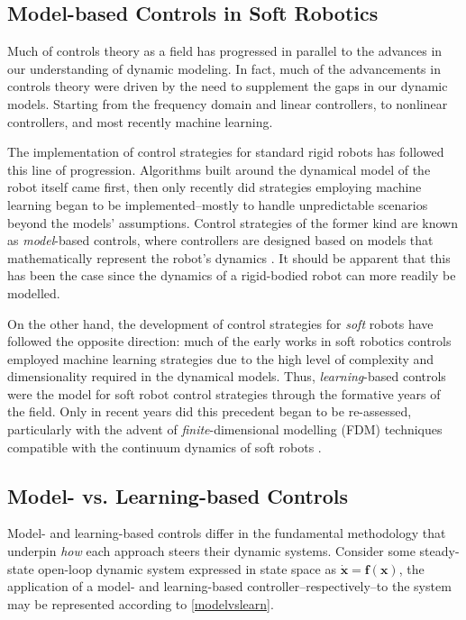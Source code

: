 \subsection{Model-based Controls in Soft Robotics}
Much of controls theory as a field has progressed in parallel to the advances in our understanding of dynamic modeling. In fact, much of the advancements in controls theory were driven by the need to supplement the gaps in our dynamic models. Starting from the frequency domain and linear controllers, to nonlinear controllers, and most recently machine learning. 

The implementation of control strategies for standard rigid robots has followed this line of progression. Algorithms built around the dynamical model of the robot itself came first, then only recently did strategies employing machine learning began to be implemented--mostly to handle unpredictable scenarios beyond the models' assumptions. Control strategies of the former kind are known as \textit{model}-based controls, where controllers are designed based on models that mathematically represent the robot's dynamics \cite{rakhmatillaev_integrative_2025}. It should be apparent that this has been the case since the dynamics of a rigid-bodied robot can more readily be modelled. 

On the other hand, the development of control strategies for \textit{soft} robots have followed the opposite direction: much of the early works in soft robotics controls employed machine learning strategies due to the high level of complexity and dimensionality required in the dynamical models. Thus, \textit{learning}-based controls were the model for soft robot control strategies through the formative years of the field. Only in recent years did this precedent began to be re-assessed, particularly with the advent of \textit{finite}-dimensional modelling (FDM) techniques compatible with the continuum dynamics of soft robots \cite{della_santina_model-based_2023}.
\subsection{Model- vs. Learning-based Controls}
Model- and learning-based controls differ in the fundamental methodology that underpin \textit{how} each approach steers their dynamic systems. Consider some steady-state open-loop dynamic system expressed in state space as $\mathbf{\dot{x}}=\mathbf{f}(\mathbf{x})$, the application of a model- and learning-based controller--respectively--to the system may be represented according to \autoref{modelvslearn}.


